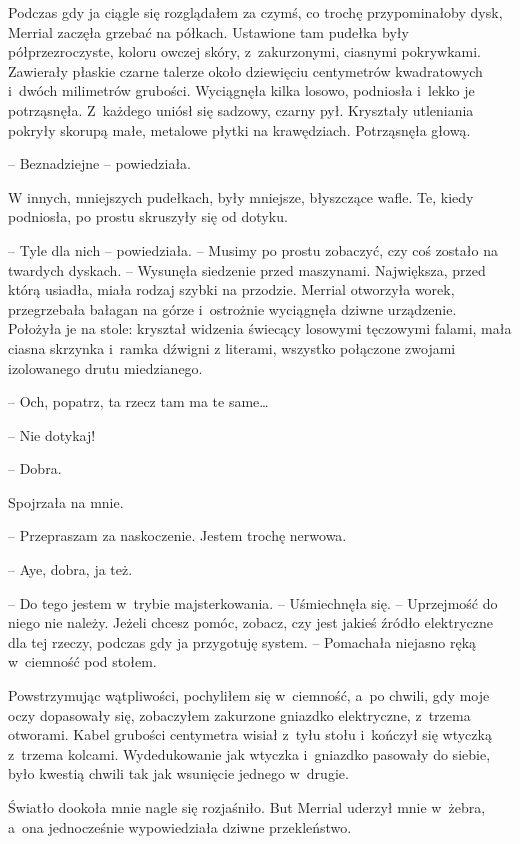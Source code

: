 \documentclass[oneside,polish,11pt,sfheadings]{mwbk}
\begin{document}
Podczas gdy ja ciągle się rozglądałem za czymś, co trochę przypominałoby
dysk, Merrial zaczęła grzebać na półkach. Ustawione tam pudełka były
półprzezroczyste, koloru owczej skóry, z~zakurzonymi, ciasnymi
pokrywkami. Zawierały płaskie czarne talerze około dziewięciu
centymetrów kwadratowych i~dwóch milimetrów grubości. Wyciągnęła kilka
losowo, podniosła i~lekko je potrząsnęła. Z~każdego uniósł się sadzowy,
czarny pył. Kryształy utleniania pokryły skorupą małe, metalowe płytki
na krawędziach. Potrząsnęła głową. 

-- Beznadziejne -- powiedziała.

W innych, mniejszych pudełkach, były mniejsze, błyszczące wafle. Te,
kiedy podniosła, po prostu skruszyły się od dotyku.

-- Tyle dla nich -- powiedziała. -- Musimy po prostu zobaczyć, czy coś
zostało na twardych dyskach. -- Wysunęła siedzenie przed maszynami.
Największa, przed którą usiadła, miała rodzaj szybki na przodzie.
Merrial otworzyła worek, przegrzebała bałagan na górze i~ostrożnie
wyciągnęła dziwne urządzenie. Położyła je na stole: kryształ widzenia
świecący losowymi tęczowymi falami, mała ciasna skrzynka i~ramka dźwigni
z literami, wszystko połączone zwojami izolowanego drutu miedzianego.

-- Och, popatrz, ta rzecz tam ma te same\ldots

-- Nie dotykaj!

-- Dobra.

Spojrzała na mnie. 

-- Przepraszam za naskoczenie. Jestem trochę nerwowa.

-- Aye, dobra, ja też.

-- Do tego jestem w~trybie majsterkowania. -- Uśmiechnęła się. -- Uprzejmość
do niego nie należy. Jeżeli chcesz pomóc, zobacz, czy jest jakieś źródło
elektryczne dla tej rzeczy, podczas gdy ja przygotuję system. -- Pomachała niejasno ręką w~ciemność pod stołem.

Powstrzymując wątpliwości, pochyliłem się w~ciemność, a~po chwili, gdy
moje oczy dopasowały się, zobaczyłem zakurzone gniazdko elektryczne, z~trzema otworami. Kabel grubości centymetra wisiał z~tyłu stołu i~kończył
się wtyczką z~trzema kolcami. Wydedukowanie jak wtyczka i~gniazdko
pasowały do siebie, było kwestią chwili tak jak wsunięcie jednego w~drugie.

Światło dookoła mnie nagle się rozjaśniło. But Merrial uderzył mnie w~żebra, a~ona jednocześnie wypowiedziała dziwne przekleństwo.
\end{document}
